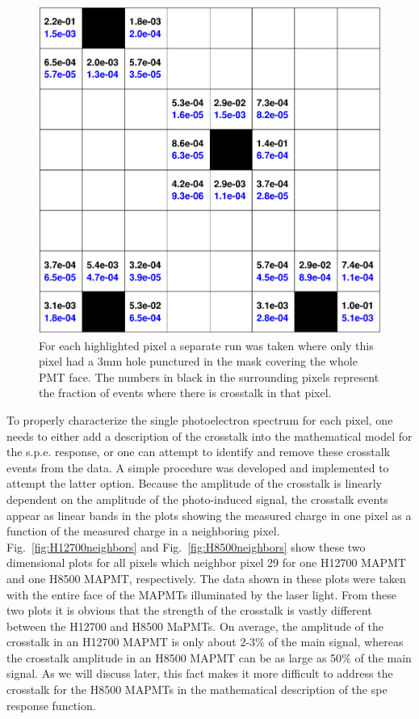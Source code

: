 \begin{figure}
	\centering
	\includegraphics[width=\linewidth]{figures/H12700_ct_ratio.png}
	\caption{For each highlighted pixel a separate run was taken where only this pixel had a 3mm hole punctured in the mask covering the whole PMT face. The numbers in black in the surrounding pixels represent the fraction of events where there is crosstalk in that pixel.}
	\label{fig:H12700_ct_ratio}
\end{figure}

To properly characterize the single photoelectron spectrum for each pixel, one needs to either add a description of the crosstalk into the mathematical model for the s.p.e. response, or one can attempt to identify and remove these crosstalk events from the data. A simple procedure was developed and implemented to attempt the latter option. Because the amplitude of the crosstalk is linearly dependent on the amplitude of the photo-induced signal, the crosstalk events appear as linear bands in the plots showing the measured charge in one pixel as a function of the measured charge in a neighboring pixel. Fig.~\ref{fig:H12700neighbors} and Fig.~\ref{fig:H8500neighbors} show these two dimensional plots for all pixels which neighbor pixel 29 for one H12700 MAPMT and one H8500 MAPMT, respectively. The data shown in these plots were taken with the entire face of the MAPMTs illuminated by the laser light. From these two plots it is obvious that the strength of the crosstalk is vastly different between the H12700 and H8500 MaPMTs. On average, the amplitude of the crosstalk in an H12700 MAPMT is only about 2-3$\%$ of the main signal, whereas the crosstalk amplitude in an H8500 MAPMT can be as large as 50$\%$ of the main signal. As we will discuss later, this fact makes it more difficult to address the crosstalk for the H8500 MAPMTs in the mathematical description of the spe response function.

